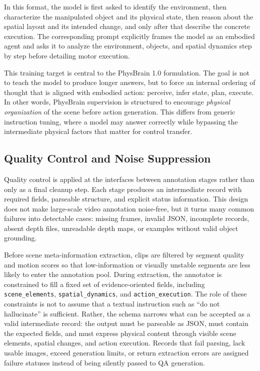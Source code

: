 In this format, the model is first asked to identify the environment, then characterize the manipulated object and its physical state, then reason about the spatial layout and its intended change, and only after that describe the concrete execution. The corresponding prompt explicitly frames the model as an embodied agent and asks it to analyze the environment, objects, and spatial dynamics step by step before detailing motor execution.

This training target is central to the PhysBrain 1.0 formulation. The goal is not to teach the model to produce longer answers, but to force an internal ordering of thought that is aligned with embodied action: perceive, infer state, plan, execute. In other words, PhysBrain supervision is structured to encourage \emph{physical organization} of the scene before action generation. This differs from generic instruction tuning, where a model may answer correctly while bypassing the intermediate physical factors that matter for control transfer.

\subsection{Quality Control and Noise Suppression}

Quality control is applied at the interfaces between annotation stages rather than only as a final cleanup step. Each stage produces an intermediate record with required fields, parseable structure, and explicit status information. This design does not make large-scale video annotation noise-free, but it turns many common failures into detectable cases: missing frames, invalid JSON, incomplete records, absent depth files, unreadable depth maps, or examples without valid object grounding.

Before scene meta-information extraction, clips are filtered by segment quality and motion scores so that low-information or visually unstable segments are less likely to enter the annotation pool. During extraction, the annotator is constrained to fill a fixed set of evidence-oriented fields, including \texttt{scene\_elements}, \texttt{spatial\_dynamics}, and \texttt{action\_execution}. The role of these constraints is not to assume that a textual instruction such as ``do not hallucinate'' is sufficient. Rather, the schema narrows what can be accepted as a valid intermediate record: the output must be parseable as JSON, must contain the expected fields, and must express physical content through visible scene elements, spatial changes, and action execution. Records that fail parsing, lack usable images, exceed generation limits, or return extraction errors are assigned failure statuses instead of being silently passed to QA generation.

